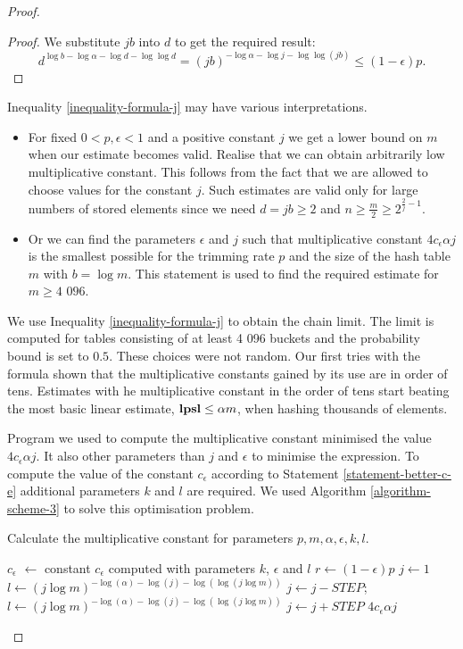 \begin{proof}
\begin{proof}
We substitute $j b$ into $d$ to get the required result:
\[
	d ^ {\log b - \log \alpha - \log d - \log \log d} = \left(j b\right)^{-\log \alpha -\log j - \log \log (j b)} \leq (1 - \epsilon)p \text{.}
\]
\end{proof}

Inequality \ref{inequality-formula-j} may have various interpretations.
\begin{itemize}
\item For fixed $0 < p, \epsilon < 1$ and a positive constant $j$ we get a lower bound on $m$ when our estimate becomes valid. Realise that we can obtain arbitrarily low multiplicative constant. This follows from the fact that we are allowed to choose values for the constant $j$. Such estimates are valid only for large numbers of stored elements since we need $d = jb \geq 2$ and $n \geq \frac{m}{2} \geq 2 ^ {\frac{2}{j} - 1}$.
\item Or we can find the parameters $\epsilon$ and $j$ such that multiplicative constant $4 c_\epsilon \alpha j$ is the smallest possible for the trimming rate $p$ and the size of the hash table $m$ with $b = \log m$. This statement is used to find the required estimate for $m \geq \text{4 096}$.
\end{itemize}

We use Inequality \ref{inequality-formula-j} to obtain the chain limit. The limit is computed for tables consisting of at least 4 096 buckets and the probability bound is set to $0.5$. These choices were not random. Our first tries with the formula shown that the multiplicative constants gained by its use are in order of tens. Estimates with he multiplicative constant in the order of tens start beating the most basic linear estimate, $\mathbf{lpsl} \leq \alpha m$, when hashing thousands of elements.

Program we used to compute the multiplicative constant minimised the value $4 c_\epsilon \alpha j$. It also other parameters than $j$ and $\epsilon$ to minimise the expression. To compute the value of the constant $c_\epsilon$ according to Statement \ref{statement-better-c-e} additional parameters $k$ and $l$ are required. We used Algorithm \ref{algorithm-scheme-3} to solve this optimisation problem.

\begin{algorithm}[H]
\caption{Calculate the multiplicative constant for parameters $p, m, \alpha, \epsilon, k, l$.}
\label{procedure-scheme-3}
\begin{algorithmic}
\STATE $c_\epsilon$ $\leftarrow$ constant $c_\epsilon$ computed with parameters $k$, $\epsilon$ and $l$
\STATE $r \leftarrow (1 - \epsilon)p$ 
\STATE $j \leftarrow 1$
\STATE 
\STATE {}
\STATE $l \leftarrow (j \log m) ^ {-\log(\alpha) - \log(j) - \log(\log(j \log m))}$
	\STATE $j \leftarrow j - STEP$;
	\STATE $l \leftarrow (j \log m) ^ {-\log(\alpha) - \log(j) - \log(\log(j \log m))}$
\ENDWHILE
\STATE
\STATE $j \leftarrow j + STEP$
\RETURN $4 c_\epsilon \alpha j$
\end{algorithmic}
\end{algorithm}


\end{proof}
